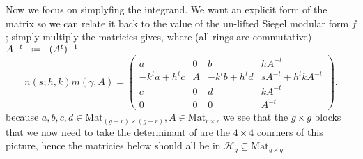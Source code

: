Now we focus on simplyfing the integrand. We want an explicit form of the matrix so we can relate it back to the value of the un-lifted Siegel modular form \(f\); simply multiply the matricies gives, where (all rings are commutative) \(A^{-t} \defeq (A^t)\inv\)
\[
		n(s; h, k) m(\gamma, A) =
		\begin{pmatrix}
			a & 0 & b & h A^{-t}\\
			-k^t a + h^t c & A & -k^t b + h^t d & s A^{-t} + h^t k A^{-t}\\
			c & 0 & d & k A^{-t}\\
			0 & 0 & 0 & A^{-t}
		\end{pmatrix}.
	\]
because \(a,b,c,d \in \mathrm{Mat}_{(g-r)\times (g-r)}, A \in \mathrm{Mat}_{r\times r}\) we see that the \(g\times g\) blocks that we now need to take the determinant of are the \(4\times 4\) conrners of this picture, hence the matricies below should all be in \(\mathcal{H}_g\subseteq \mathrm{Mat}_{g\times g}\)

